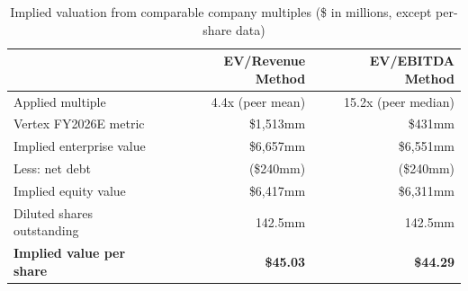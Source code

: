 \begin{table}[H]
\centering
\small
\caption{Implied valuation from comparable company multiples (\$ in millions, except per-share data)}
\label{tab:comps-implied}
\begin{tabular}{@{}lrr@{}}
\toprule
& \textbf{EV/Revenue Method} & \textbf{EV/EBITDA Method} \\
\midrule
Applied multiple & 4.4x (peer mean) & 15.2x (peer median) \\
Vertex FY2026E metric & \$1,513mm & \$431mm \\
Implied enterprise value & \$6,657mm & \$6,551mm \\
Less: net debt & (\$240mm) & (\$240mm) \\
Implied equity value & \$6,417mm & \$6,311mm \\
Diluted shares outstanding & 142.5mm & 142.5mm \\
\midrule
\textbf{Implied value per share} & \textbf{\$45.03} & \textbf{\$44.29} \\
\bottomrule
\end{tabular}
\end{table}
